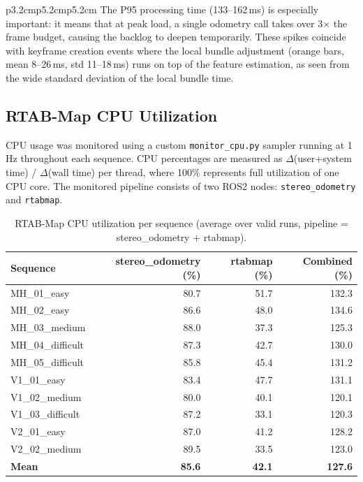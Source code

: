 \documentclass[11pt]{article}
\begin{document}
\begin{table}[ht]
\begin{tabular}{p{3.2cm}p{5.2cm}p{5.2cm}}
The P95 processing time (133--162\,ms) is especially important: it means that at peak load, a single odometry call takes over 3$\times$ the frame budget, causing the backlog to deepen temporarily. These spikes coincide with keyframe creation events where the local bundle adjustment (orange bars, mean 8--26\,ms, std 11--18\,ms) runs on top of the feature estimation, as seen from the wide standard deviation of the local bundle time.

\subsection{RTAB-Map CPU Utilization}

CPU usage was monitored using a custom \texttt{monitor\_cpu.py} sampler running at 1\,Hz throughout each sequence. CPU percentages are measured as $\Delta$(user+system time) / $\Delta$(wall time) per thread, where 100\% represents full utilization of one CPU core. The monitored pipeline consists of two ROS2 nodes: \texttt{stereo\_odometry} and \texttt{rtabmap}.

\begin{table}[H]
\centering
\small
\caption{RTAB-Map CPU utilization per sequence (average over valid runs, pipeline = stereo\_odometry + rtabmap).}
\label{tab:rtabmap_cpu}
\begin{tabular}{lrrr}
\toprule
Sequence & stereo\_odometry (\%) & rtabmap (\%) & Combined (\%) \\
\midrule
MH\_01\_easy       & 80.7  & 51.7 & 132.3 \\
MH\_02\_easy       & 86.6  & 48.0 & 134.6 \\
MH\_03\_medium     & 88.0  & 37.3 & 125.3 \\
MH\_04\_difficult  & 87.3  & 42.7 & 130.0 \\
MH\_05\_difficult  & 85.8  & 45.4 & 131.2 \\
V1\_01\_easy       & 83.4  & 47.7 & 131.1 \\
V1\_02\_medium     & 80.0  & 40.1 & 120.1 \\
V1\_03\_difficult  & 87.2  & 33.1 & 120.3 \\
V2\_01\_easy       & 87.0  & 41.2 & 128.2 \\
V2\_02\_medium     & 89.5  & 33.5 & 123.0 \\
\midrule
\textbf{Mean}      & \textbf{85.6} & \textbf{42.1} & \textbf{127.6} \\
\bottomrule
\end{tabular}
\end{table}


\end{tabular}
\end{table}
\end{document}
